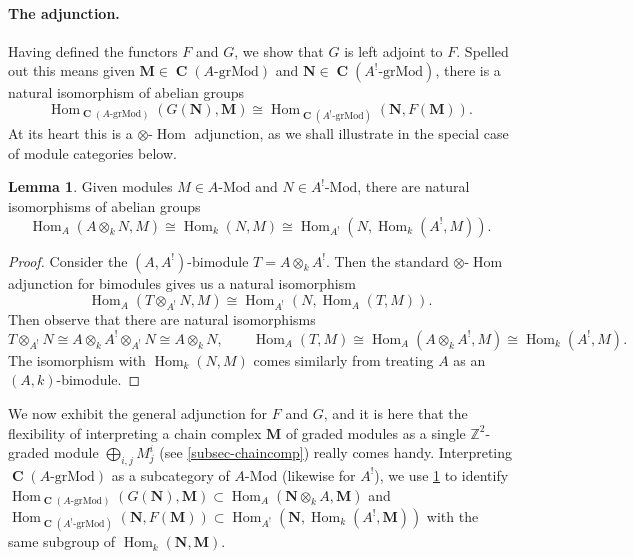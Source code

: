 \documentclass[a4paper]{article}
\theoremstyle{definition}
\newtheorem{lemma}[defn]{Lemma}
\theoremstyle{remark}
\newcommand{\grMod}{\ensuremath{\text{-grMod}}}
\newcommand{\Mod}{\ensuremath{\text{-Mod}}}
\DeclareMathOperator{\Hom}{\text{Hom}}
\DeclareMathOperator{\Ch}{\mathbf{C}}
\begin{document}
\paragraph{The adjunction.} 
Having defined the functors \(F\) and \(G\), we show that \(G\) is left adjoint
to \(F\). Spelled out this means given \(\mathbf{M}\in \Ch(A\grMod)\) and
\(\mathbf{N}\in \Ch(A^!\grMod)\), there is a natural isomorphism of abelian
groups
\[\Hom_{\Ch(A\grMod)}(G(\mathbf{N}), \mathbf{M}) \cong
\Hom_{\Ch(A^!\grMod)}(\mathbf{N}, F(\mathbf{M})).\]
At its heart this is a \(\otimes\)-\(\Hom\) adjunction, as we shall illustrate in
the special case of module categories below. 

\begin{lemma} \label{adjunction-simple}
    Given modules \(M\in A\Mod\) and \(N\in A^!\Mod\), there are natural
    isomorphisms of abelian groups
    \[\Hom_{A}(A\otimes_k N, M) \cong \Hom_k(N,M) \cong \Hom_{A^!}(N,
    \Hom_{k}(A^!,M)).\]
    \begin{proof}
        Consider the \((A,A^!)\)-bimodule \(T=A\otimes_k A^!\). Then the
        standard \(\otimes\)-\(\Hom\) adjunction for bimodules
        \cite{bourbaki_algebra_1989} gives us a natural isomorphism 
        \[\Hom_A(T \otimes_{A^!} N, M) \cong \Hom_{A^!}(N, \Hom_{A}(T,M)).\]
        Then observe that there are natural isomorphisms
        \[T \otimes_{A^!} N \cong A\otimes_k A^! \otimes_{A^!} N \cong A\otimes_k
        N, \qquad \Hom_A(T,M)\cong \Hom_A(A\otimes_k A^!, M)\cong \Hom_k(A^!,M).\]
        The isomorphism with \(\Hom_k(N,M)\) comes similarly from treating \(A\)
        as an \((A,k)\)-bimodule.
    \end{proof}
\end{lemma}

We now exhibit the general adjunction for \(F\) and \(G\), and it is here that
the flexibility of interpreting a chain complex \(\mathbf{M}\) of graded modules
as a single \(\mathbb{Z}^2\)-graded module \(\bigoplus_{i,j}M^i_j\) (see
\cref{subsec-chaincomp}) really comes handy.  Interpreting \(\Ch(A\grMod)\) as a
subcategory of \(A\Mod\) (likewise for \(A^!\)), we use \cref{adjunction-simple}
to identify \(\Hom_{\Ch(A\grMod)}(G(\mathbf{N}),\mathbf{M})\subset
\Hom_A(\mathbf{N}\otimes_k A, \mathbf{M})\) and
\(\Hom_{\Ch(A^!\grMod)}(\mathbf{N},F(\mathbf{M}))\subset \Hom_{A^!}(\mathbf{N},
\Hom_k(A^!,\mathbf{M}))\) with the same subgroup of
\(\Hom_k(\mathbf{N},\mathbf{M})\).
\end{document}

